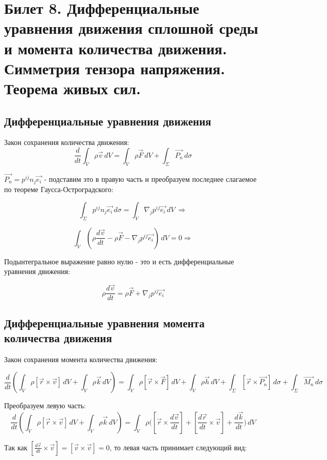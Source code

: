 \newpage
\section{Билет 8. Дифференциальные уравнения движения сплошной среды и момента количества движения. Симметрия тензора напряжения. Теорема живых сил.}
\subsection{Дифференциальные уравнения движения}
Закон сохранения количества движения:
$$\frac{d}{dt}  \int_{V} \rho \vec{v} \,dV =  \int_{V} \rho \vec{F} \,dV  + \int_{\Sigma} \vec{P_n} \,d\sigma $$

$\vec{P_n} =  p^{ij}n_j \vec{e_i}$ - подставим это в правую часть и преобразуем последнее слагаемое по теореме Гаусса-Остроградского:



$$\int_{\Sigma} p^{ij}n_j \vec{e_i} \,d\sigma = \int_{V} \nabla_j p^{ij} \vec{e_i}  \,dV \ \Rightarrow$$

$$\int_{V} (\rho \frac{d \vec{v}}{dt} -  \rho \vec{F}   -  \nabla_j p^{ij} \vec{e_i} ) \,dV = 0 \Rightarrow$$

Подынтегральное выражение равно нулю - это и есть дифференциальные уравнения движения:

$$\rho \frac{d \vec{v}}{dt} =  \rho \vec{F}   +  \nabla_j p^{ij} \vec{e_i} $$

\subsection{Дифференциальные уравнения момента количества движения}
Закон сохранения момента количества движения:

$$\frac{d}{dt} ( \int_{V} \rho [\vec{r} \times \vec{v}] \,dV +   \int_{V} \rho \vec{k} \,dV )  =  \int_{V} \rho [\vec{r} \times \vec{F}] \,dV  +  \int_{V} \rho \vec{h} \,dV + \int_{\Sigma} [\vec{r} \times \vec{P_n}] \,d\sigma + \int_{\Sigma} \vec{M_n} \,d\sigma $$

Преобразуем левую часть:
$$\frac{d}{dt} ( \int_{V} \rho [\vec{r} \times \vec{v}] \,dV +   \int_{V} \rho \vec{k} \,dV ) = \int_{V} \rho ([\vec{r} \times \frac{d\vec{v}}{dt}] + [\frac{d\vec{r}}{dt} \times \vec{v}] +  \frac{d \vec{k}}{dt} \big ) \,dV  $$

Так как  $[\frac{d\vec{r}}{dt} \times \vec{v}] =  [\vec{v} \times \vec{v}] = 0$, то левая часть принимает следующий вид:

